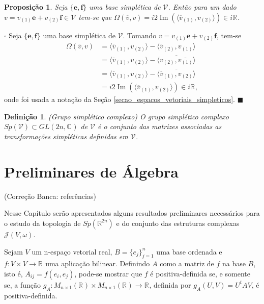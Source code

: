 \documentclass[12pt]{book}
\newtheorem{definicao}[teorema]{Definição}
\newtheorem{proposicao}[teorema]{Proposição}
\newenvironment{prova}[1]{$\square$ #1}{\hfill$\blacksquare$}
\DeclareMathOperator{\Ima}{Im}
\newcommand{\complexificado}[1]{\mathcal{#1}}
\newcommand{\complexo}[1]{\mathbb{C}^{#1}}
\newcommand{\estruturascomplexas}[2]{\mathcal{J}(#1, #2)}
\newcommand{\formaSimpleticaExtendida}[2]{\Omega(#1, #2)}
\newcommand{\generalgroup}[2]{GL(#1, #2)}
\newcommand{\generalgroupcomplexo}[1]{\generalgroup{#1}{\complexo{}}}
\newcommand{\gruposimpletico}[1]{Sp(#1)}
\newcommand{\parteImaginaria}[1]{\Ima{(#1)}}
\newcommand{\produtointerno}[2]{\langle #1, #2 \rangle}
\newcommand{\real}[1]{\mathbb{R}^{#1}}
\newcommand{\reta}{\real{}}
\newcommand{\alerta}[1]{{\color{red}#1}}
\newcommand{\correcaobanca}[1]{\alerta{(Correção Banca: #1)}}
\begin{document}
	\begin{proposicao}\label{proposicao_forma_simpletica_vetor_conjugado}
		Seja $\{\textbf{e}, \textbf{f}\}$ uma base simplética de $\complexificado{V}$. Então para um dado $v = v_{(1)}\textbf{e}+v_{(2)}\textbf{f} \in \complexificado{V}$ tem-se que $\formaSimpleticaExtendida{\overline{v}}{v}
		=i2\parteImaginaria{\produtointerno{\overline{v}_{(1)}}{v_{(2)}}} \in i\reta$.
	\end{proposicao}
	\begin{prova}
		Seja $\{\textbf{e}, \textbf{f} \}$ uma base simplética de $\complexificado{V}$. Tomando $v = v_{(1)}\textbf{e}+v_{(2)}\textbf{f}$, tem-se
		$$
		\begin{aligned}
		\formaSimpleticaExtendida{\overline{v}}{v} 
		&= \produtointerno{\overline{v}_{(1)}}{v_{(2)}}- \produtointerno{\overline{v}_{(2)}}{v_{(1)}}
		\\
		&= \produtointerno{\overline{v}_{(1)}}{v_{(2)}}- \overline{\produtointerno{v_{(2)}}{\overline{v_{(1)}}}}
		\\
		&= \produtointerno{\overline{v}_{(1)}}{v_{(2)}}-\overline{ \produtointerno{\overline{v}_{(1)}}{v_{(2)}}}
		\\
		&=i2\parteImaginaria{\produtointerno{\overline{v}_{(1)}}{v_{(2)}}}\in i\reta,
		\end{aligned}
		$$
		onde foi usada a notação da Seção \ref{secao_espacos_vetoriais_simpleticos}.
	\end{prova}
		
	\begin{definicao}
		(Grupo simplético complexo) O grupo simplético complexo $\gruposimpletico{\complexificado{V}} \subset \generalgroupcomplexo{2n}$ de $\complexificado{V}$ é o conjunto das matrizes associadas as transformações simpléticas definidas em $\complexificado{V}$.
	\end{definicao}
	
	\chapter{Preliminares de Álgebra}
	
	\correcaobanca{referências}
	
	Nesse Capítulo serão apresentados alguns resultados preliminares necessários para o estudo da topologia de $\gruposimpletico{\real{2n}}$ e do conjunto das estruturas complexas $\estruturascomplexas{V}{\omega}$.
	
	
	Sejam $V$ um n-espaço vetorial real, $B= \{e_{j}\}_{j=1}^{n}$ uma base ordenada e $f:V\times V\to \reta$ uma aplicação bilinear. Definindo $A$ como a matriz de $f$ na base $B$, isto é, $A_{ij} = f(e_{i}, e_{j})$, pode-se mostrar que $f$ é positiva-definida se, e somente se, a função $g_{A}: M_{n\times 1}(\reta)\times M_{n\times 1}(\reta) \to \reta$, definida por $
	g_{A}(U,V) = U^{t}AV$, é positiva-definida.
	
\end{document}
